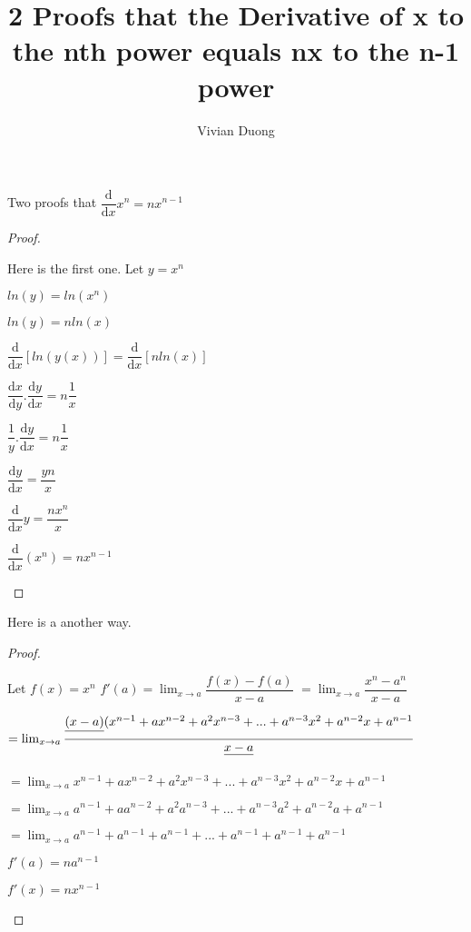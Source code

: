 \documentclass{article}
\title{2 Proofs that the Derivative of x to the nth power equals nx to the n-1 power}
\author{Vivian Duong}
\date{}
\begin{document}
\maketitle
Two proofs that
$\dfrac{\mathrm{d}}{\mathrm{d}x} x^n = nx^{n-1}$


\begin{proof}
\begin{center}
Here is the first one. 
\newline 
Let $ y = x^n$

$ln(y) = ln(x^n)$

$ln(y) = nln(x)$

$\dfrac{\mathrm{d}}{\mathrm{d}x}[ln(y(x))] = \dfrac{\mathrm{d}}{\mathrm{d}x}[nln(x)]$


$\dfrac{\mathrm{d}x}{\mathrm{d}y}.\dfrac{\mathrm{d}y}{\mathrm{d}x} = n \dfrac{1}{x}$

$\dfrac{1}{y}.\dfrac{\mathrm{d}y}{\mathrm{d}x} = n \dfrac{1}{x}$

$\dfrac{\mathrm{d}y}{\mathrm{d}x} = \dfrac{yn}{x}$

$\dfrac{\mathrm{d}}{\mathrm{d}x}y = \dfrac{nx^n}{x}$

$\dfrac{\mathrm{d}}{\mathrm{d}x}(x^n) = nx^{n-1}$

\end{center}
\end{proof}

Here is a another way.

\begin{proof}
\begin{center}
Let $f(x) = x^n$
\newline
$f'(a) = \lim_{x \rightarrow a} \dfrac{f(x)-f(a)}{x-a}$
\newline
$ =  \lim_{x \rightarrow a} \dfrac{x^n-a^n}{x-a}$

$ = \lim_{x \rightarrow a} \dfrac{\sout{(x-a)}(x^{n-1}+ax^{n-2} + a^2x^{n-3} +... + a^{n-3}x^2 + a^{n-2}x + a^{n-1}}{\sout{x-a}}$

$ = \lim_{x \rightarrow a} x^{n-1}+ax^{n-2} + a^2x^{n-3} +... + a^{n-3}x^2 + a^{n-2}x + a^{n-1}$

$ = \lim_{x \rightarrow a} a^{n-1}+aa^{n-2} + a^2a^{n-3} +... + a^{n-3}a^2 + a^{n-2}a + a^{n-1}$

$ = \lim_{x \rightarrow a} a^{n-1}+a^{n-1} + a^{n-1} +... + a^{n-1} + a^{n-1} + a^{n-1}$

$f'(a) = na^{n-1}$

$f'(x) = nx^{n-1}$

\end{center}
\end{proof}
\end{document}

